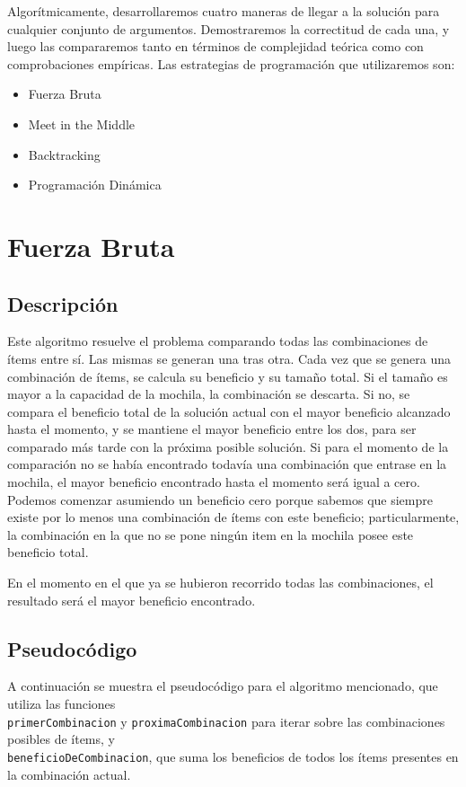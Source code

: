 \documentclass[10pt, a4paper]{article}
\begin{document}
Algorítmicamente, desarrollaremos cuatro maneras de llegar a la solución para cualquier conjunto de argumentos. Demostraremos la correctitud de cada una, y luego las compararemos tanto en términos de complejidad teórica como con comprobaciones empíricas. Las estrategias de programación que utilizaremos son:
\begin{itemize}
	\item Fuerza Bruta
	\item Meet in the Middle
	\item Backtracking
	\item Programación Dinámica
\end{itemize}

\section{Fuerza Bruta}
\subsection{Descripción}
Este algoritmo resuelve el problema comparando todas las combinaciones de ítems entre sí.
Las mismas se generan una tras otra. Cada vez que se genera una combinación de ítems, se calcula su beneficio y su tamaño total. Si el tamaño es mayor a la capacidad de la mochila, la combinación se descarta. Si no, se compara el beneficio total de la solución actual con el mayor beneficio alcanzado hasta el momento, y se mantiene el mayor beneficio entre los dos, para ser comparado más tarde con la próxima posible solución. Si para el momento de la comparación no se había encontrado todavía una combinación que entrase en la mochila, el mayor beneficio encontrado hasta el momento será igual a cero. Podemos comenzar asumiendo un beneficio cero porque sabemos que siempre existe por lo menos una combinación de ítems con este beneficio; particularmente, la combinación en la que no se pone ningún item en la mochila posee este beneficio total.\par
En el momento en el que ya se hubieron recorrido todas las combinaciones, el resultado será el mayor beneficio encontrado. \par

\subsection{Pseudocódigo}

A continuación se muestra el pseudocódigo para el algoritmo mencionado, que utiliza las funciones \\
\texttt{primerCombinacion} y \texttt{proximaCombinacion} para iterar sobre las combinaciones posibles de ítems, y \\
\texttt{beneficioDeCombinacion}, que suma los beneficios de todos los ítems presentes en la combinación actual.
\end{document}
